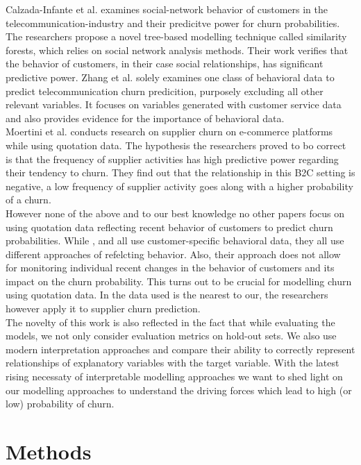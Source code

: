 \documentclass[12pt,titlepage]{article}
\begin{document}
Calzada-Infante et al. \cite{calzada} examines social-network behavior of customers in the telecommunication-industry and their predicitve power for churn probabilities. The researchers propose a novel tree-based modelling technique called similarity forests, which relies on social network analysis methods. Their work verifies that the behavior of customers, in their case social relationships, has significant predictive power. Zhang et al. \cite{zhang} solely examines one class of behavioral data to predict telecommunication churn predicition, purposely excluding all other relevant variables. It focuses on variables generated with customer service data and also provides evidence for the importance of behavioral data. \\
Moertini et al. \cite{moertini} conducts research on supplier churn on e-commerce platforms while using quotation data. The hypothesis the researchers proved to bo correct is that the frequency of supplier activities has high predictive power regarding their tendency to churn. They find out that the relationship in this B2C setting is negative, a low frequency of supplier activity goes along with a higher probability of a churn. \\
However none of the above and to our best knowledge no other papers focus on using quotation data reflecting recent behavior of customers to predict churn probabilities. While \cite{khodabandehlou}, \cite{calzada} and \cite{zhang} all use customer-specific behavioral data, they all use different approaches of refelcting behavior. Also, their approach does not allow for monitoring individual recent changes in the behavior of customers and its impact on the churn probability. This turns out to be crucial for modelling churn using quotation data. In \cite{moertini} the data used is the nearest to our, the researchers however apply it to supplier churn prediction. \\
The novelty of this work is also reflected in the fact that while evaluating the models, we not only consider evaluation metrics on hold-out sets. We also use modern interpretation approaches and compare their ability to correctly represent relationships of explanatory variables with the target variable. With the latest rising necessaty of interpretable modelling approaches we want to shed light on our modelling approaches to understand the driving forces which lead to high (or low) probability of churn. \\


\section{Methods} \par
\end{document}
